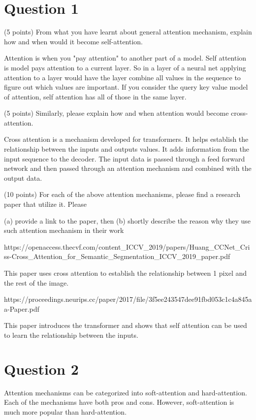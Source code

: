 \documentclass{article}
\begin{document}
\section*{Question 1}

(5 points) From what you have learnt about general attention mechanism, explain how and when would it become self-attention.

Attention is when you "pay attention" to another part of a model. Self attention is model pays attention to a current layer. So in a layer of a neural net applying attention to a layer would have the layer combine all values in the sequence to figure out which values are important. If you consider the query key value model of attention, self attention has all of those in the same layer.


(5 points) Similarly, please explain how and when attention would become cross-attention.

Cross attention is a mechanism developed for transformers. It helps establish the relationship between the inputs and outputs values. It adds information from the input sequence to the decoder. The input data is passed through a feed forward network and then passed through an attention mechanism and combined with the output data.


(10 points) For each of the above attention mechanisms, please find a research paper that utilize it. Please


(a) provide a link to the paper, then (b) shortly describe the reason why they use such attention mechanism in their work

https://openaccess.thecvf.com/content_ICCV_2019/papers/Huang_CCNet_Criss-Cross_Attention_for_Semantic_Segmentation_ICCV_2019_paper.pdf

This paper uses cross attention to establish the relationship between 1 pixel and the rest of the image.

https://proceedings.neurips.cc/paper/2017/file/3f5ee243547dee91fbd053c1c4a845aa-Paper.pdf

This paper introduces the transformer and shows that self attention can be used to learn the relationship between the inputs.


\section*{Question 2}

Attention mechanisms can be categorized into soft-attention and hard-attention. Each of the mechanisms have both pros and cons. However, soft-attention is much more popular than hard-attention.
\end{document}
